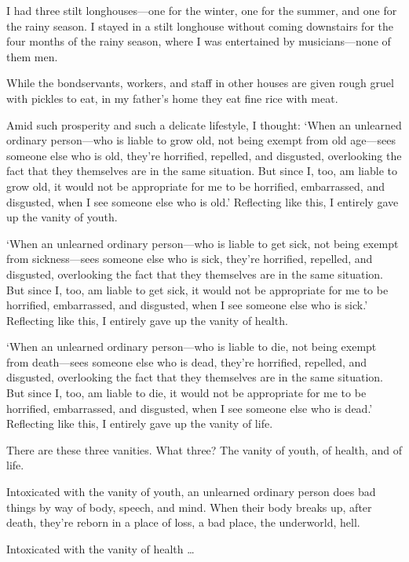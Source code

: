 \documentclass[12pt,openany]{book}%
\begin{document}
I had three stilt longhouses—one for the winter, one for the summer, and one for the rainy season. I stayed in a stilt longhouse without coming downstairs for the four months of the rainy season, where I was entertained by musicians—none of them men. 

While the bondservants, workers, and staff in other houses are given rough gruel with pickles to eat, in my father’s home they eat fine rice with meat. 

Amid such prosperity and such a delicate lifestyle, I thought: ‘When an unlearned ordinary person—who is liable to grow old, not being exempt from old age—sees someone else who is old, they’re horrified, repelled, and disgusted, overlooking the fact that they themselves are in the same situation. But since I, too, am liable to grow old, it would not be appropriate for me to be horrified, embarrassed, and disgusted, when I see someone else who is old.’ Reflecting like this, I entirely gave up the vanity of youth. 

‘When an unlearned ordinary person—who is liable to get sick, not being exempt from sickness—sees someone else who is sick, they’re horrified, repelled, and disgusted, overlooking the fact that they themselves are in the same situation. But since I, too, am liable to get sick, it would not be appropriate for me to be horrified, embarrassed, and disgusted, when I see someone else who is sick.’ Reflecting like this, I entirely gave up the vanity of health. 

‘When an unlearned ordinary person—who is liable to die, not being exempt from death—sees someone else who is dead, they’re horrified, repelled, and disgusted, overlooking the fact that they themselves are in the same situation. But since I, too, am liable to die, it would not be appropriate for me to be horrified, embarrassed, and disgusted, when I see someone else who is dead.’ Reflecting like this, I entirely gave up the vanity of life. 

There are these three vanities. What three? The vanity of youth, of health, and of life. 

Intoxicated with the vanity of youth, an unlearned ordinary person does bad things by way of body, speech, and mind. When their body breaks up, after death, they’re reborn in a place of loss, a bad place, the underworld, hell. 

Intoxicated with the vanity of health … 
\end{document}
